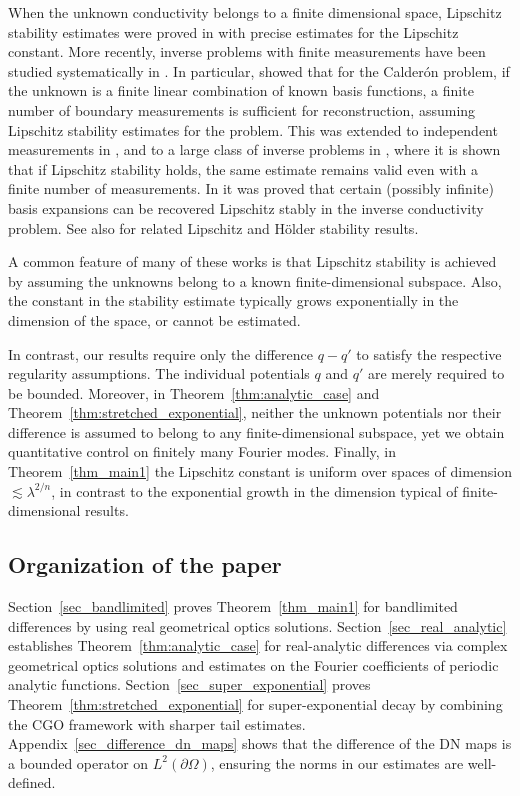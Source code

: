 \documentclass[a4paper, 11pt, twoside, notitlepage]{amsart}
\theoremstyle{definition}
\theoremstyle{remark}
\begin{document}
When the unknown conductivity belongs to a finite dimensional space, Lipschitz stability estimates were proved in \cite{ALESSANDRINI2005207} with precise estimates for the Lipschitz constant. More recently, inverse problems with finite measurements have been studied systematically in \cite{alberti2019calderon, alberti2022calderon, alberti2022infinite, alberti2023inverse}. In particular, \cite{alberti2019calderon} showed that for the Calderón problem, if the unknown is a finite linear combination of known basis functions, a finite number of boundary measurements is sufficient for reconstruction, assuming Lipschitz stability estimates for the problem. This was extended to independent measurements in \cite{alberti2022calderon}, and to a large class of inverse problems in \cite{alberti2022infinite}, where it is shown that if Lipschitz stability holds, the same estimate remains valid even with a finite number of measurements. In \cite{garde2026infinite} it was proved that certain (possibly infinite) basis expansions can be recovered Lipschitz stably in the inverse conductivity problem. See also \cite{bourgeois2013, carstea2026} for related Lipschitz and Hölder stability results.

A common feature of many of these works is that Lipschitz stability is achieved by assuming the unknowns belong to a known finite-dimensional subspace. Also, the constant in the stability estimate typically grows exponentially in the dimension of the space, or cannot be estimated. 

In contrast, our results require only the difference $q - q'$ to satisfy the respective regularity assumptions. The individual potentials $q$ and $q'$ are merely required to be bounded. Moreover, in Theorem~\ref{thm:analytic_case} and Theorem~\ref{thm:stretched_exponential}, neither the unknown potentials nor their difference is assumed to belong to any finite-dimensional subspace, yet we obtain quantitative control on finitely many Fourier modes. Finally, in Theorem~\ref{thm_main1} the Lipschitz constant is uniform over spaces of dimension $\lesssim \lambda^{2/n}$, in contrast to the exponential growth in the dimension typical of finite-dimensional results.

\subsection*{Organization of the paper}

Section~\ref{sec_bandlimited} proves Theorem~\ref{thm_main1} for bandlimited differences by using real geometrical optics solutions. Section~\ref{sec_real_analytic} establishes Theorem~\ref{thm:analytic_case} for real-analytic differences via complex geometrical optics solutions and estimates on the Fourier coefficients of periodic analytic functions. Section~\ref{sec_super_exponential} proves Theorem~\ref{thm:stretched_exponential} for super-exponential decay by combining the CGO framework with sharper tail estimates. Appendix~\ref{sec_difference_dn_maps} shows that the difference of the DN maps is a bounded operator on $L^2(\partial\Omega)$, ensuring the norms in our estimates are well-defined.
\end{document}
